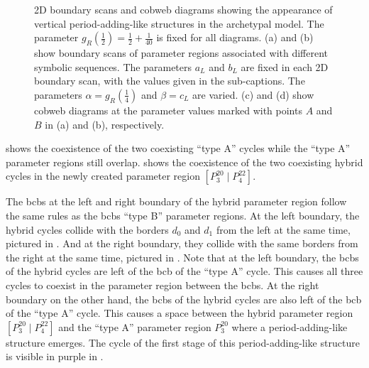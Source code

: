 \begin{figure}
{		\label{fig:add.change.appa.vert.cobweb.A}
	}
	\caption[2D boundary scans and cobweb diagrams showing the appearance of vertical period-adding-like structures in the archetypal model]{
		2D boundary scans and cobweb diagrams showing the appearance of vertical period-adding-like structures in the archetypal model.
		The parameter $g_R\left(\frac{1}{2}\right) = \frac{1}{2} + \frac{1}{40}$ is fixed for all diagrams.
		(a) and (b) show boundary scans of parameter regions associated with different symbolic sequences.
		The parameters $a_L$ and $b_L$ are fixed in each 2D boundary scan, with the values given in the sub-captions.
		The parameters $\alpha = g_R\left(\frac{1}{4}\right)$ and $\beta = c_L$ are varied.
		(c) and (d) show cobweb diagrams at the parameter values marked with points $A$ and $B$ in (a) and (b), respectively.
	}
\end{figure}

 shows the coexistence of the two coexisting ``type A'' cycles while the ``type A'' parameter regions still overlap.
 shows the coexistence of the two coexisting hybrid cycles in the newly created parameter region $\left[P^{20}_3 \mid P^{22}_4\right]$.

The \glspl{bcb} at the left and right boundary of the hybrid parameter region follow the same rules as the \glspl{bcb} ``type B'' parameter regions.
At the left boundary, the hybrid cycles collide with the borders $d_0$ and $d_1$ from the left at the same time, pictured in .
And at the right boundary, they collide with the same borders from the right at the same time, pictured in .
Note that at the left boundary, the \glspl{bcb} of the hybrid cycles are left of the \gls{bcb} of the ``type A'' cycle.
This causes all three cycles to coexist in the parameter region between the \glspl{bcb}.
At the right boundary on the other hand, the \glspl{bcb} of the hybrid cycles are also left of the \gls{bcb} of the ``type A'' cycle.
This causes a space between the hybrid parameter region $\left[P^{20}_3 \mid P^{22}_4\right]$ and the ``type A'' parameter region $P^{20}_3$ where a period-adding-like structure emerges.
The cycle of the first stage of this period-adding-like structure is visible in purple in .

